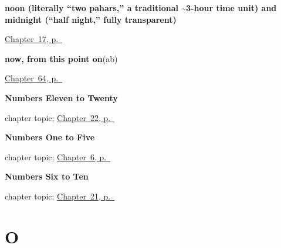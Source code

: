 \noindent\begin{minipage}[t]{\linewidth}
\raggedright
\textbf{noon (literally \textquotedblleft{}two pahars,\textquotedblright{} a traditional \textasciitilde{}3-hour time unit) and midnight (\textquotedblleft{}half night,\textquotedblright{} fully transparent)}\enspace\emph{  }\par
\footnotesize \hyperref[ch:hi-noon-and-midnight]{Chapter~17, p.~\pageref*{ch:hi-noon-and-midnight}}
\end{minipage}\par\smallskip

\noindent\begin{minipage}[t]{\linewidth}
\raggedright
\textbf{now, from this point on}\enspace\emph{}\enspace(ab)\par
\footnotesize \hyperref[ch:hi-how-much-and-how-fast]{Chapter~64, p.~\pageref*{ch:hi-how-much-and-how-fast}}
\end{minipage}\par\smallskip

\noindent\begin{minipage}[t]{\linewidth}
\raggedright
\textbf{Numbers Eleven to Twenty}\par
\footnotesize chapter topic; \hyperref[ch:hi-numbers-eleven-to-twenty]{Chapter~22, p.~\pageref*{ch:hi-numbers-eleven-to-twenty}}
\end{minipage}\par\smallskip

\noindent\begin{minipage}[t]{\linewidth}
\raggedright
\textbf{Numbers One to Five}\par
\footnotesize chapter topic; \hyperref[ch:hi-numbers-1-5]{Chapter~6, p.~\pageref*{ch:hi-numbers-1-5}}
\end{minipage}\par\smallskip

\noindent\begin{minipage}[t]{\linewidth}
\raggedright
\textbf{Numbers Six to Ten}\par
\footnotesize chapter topic; \hyperref[ch:hi-numbers-six-to-ten]{Chapter~21, p.~\pageref*{ch:hi-numbers-six-to-ten}}
\end{minipage}\par\smallskip

\section*{O}

